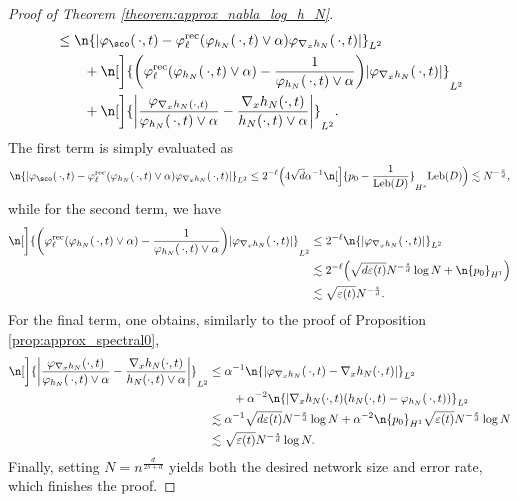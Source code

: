 \documentclass[a4paper, 11pt, headings = small, abstract]{scrartcl}
\begin{document}
\begin{proof}[Proof of Theorem \ref{theorem:approx_nabla_log_h_N}]
\begin{align*}
		&\le\n{|\varphi_\sco(\,\cdot,t)-\varphi^{\mathrm{rec}}_{\ell}(\varphi_{h_N}(\,\cdot,t)\vee\alpha)\varphi_{\nabla_xh_N}(\,\cdot,t)|}_{L^2} \\
		&\qquad+\n[\bigg]{\bigg(\varphi_{\ell}^{\mathrm{rec}}(\varphi_{h_N}(\,\cdot,t)\vee\alpha)-\frac{1}{\varphi_{h_N}(\,\cdot,t)\vee\alpha}\bigg)|\varphi_{\nabla_xh_N}(\,\cdot,t)|}_{L^2} \\
		&\qquad+\n[\bigg]{\bigg|\frac{\varphi_{\nabla_xh_N(\cdot, t)}}{\varphi_{h_N}(\,\cdot,t)\vee\alpha}-\frac{\nabla_xh_N(\cdot, t)}{h_N(\cdot, t)\vee\alpha}\bigg|}_{L^2}.
	\end{align*}
	The first term is simply evaluated as
	\[
		\n{|\varphi_\sco(\,\cdot,t)-\varphi^{\mathrm{rec}}_{\ell}(\varphi_{h_N}(\,\cdot,t)\vee\alpha)\varphi_{\nabla_xh_N}(\,\cdot,t)|}_{L^2}
		\le 2^{-\ell}\Big(4\sqrt{d}\alpha^{-1}\n[\Big]{p_0-\frac{1}{\mathrm{Leb}(D)}}_{H^s}\mathrm{Leb}(D)\Big)
		\lesssim N^{-\frac{s}{d}},
	\]
	while for the second term, we have
	\begin{align*}
		\n[\bigg]{\bigg(\varphi_{\ell}^{\mathrm{rec}}(\varphi_{h_N}(\,\cdot,t)\vee\alpha)-\frac{1}{\varphi_{h_N}(\,\cdot,t)\vee\alpha}\bigg)|\varphi_{\nabla_xh_N}(\,\cdot,t)|}_{L^2}
		&\le 2^{-\ell}\n{|\varphi_{\nabla_xh_N}(\,\cdot,t)|}_{L^2} \\
		&\lesssim2^{-\ell}\Big(\sqrt{d\varepsilon(t)}N^{-\frac{s}{d}}\log N+\n{p_0}_{H^1}\Big) \\
		&\lesssim \sqrt{\varepsilon(t)}N^{-\frac{s}{d}}.
	\end{align*}
For the final term, one obtains, similarly to the proof of Proposition \ref{prop:approx_spectral0},
	\begin{align*}
		\n[\bigg]{\bigg|\frac{\varphi_{\nabla_xh_N}(\cdot, t)}{\varphi_{h_N}(\,\cdot,t)\vee\alpha}-\frac{\nabla_xh_N(\cdot, t)}{h_N(\cdot, t)\vee\alpha}\bigg|}_{L^2}
		&\le\alpha^{-1}\n{|\varphi_{\nabla_xh_N}(\,\cdot,t)-\nabla_xh_N(\cdot, t)|}_{L^2} \\
		&\qquad+\alpha^{-2}\n{|\nabla_xh_N(\cdot, t)(h_N(\cdot, t)-\varphi_{h_N}(\,\cdot,t))}_{L^2} \\
		&\lesssim\alpha^{-1}\sqrt{d\varepsilon(t)}N^{-\frac{s}{d}}\log N
		+\alpha^{-2}\n{p_0}_{H^1}\sqrt{\varepsilon(t)}N^{-\frac{s}{d}}\log N \\
		&\lesssim \sqrt{\varepsilon(t)}N^{-\frac{s}{d}}\log N.
	\end{align*}
        Finally, setting $N=n^{\frac{d}{2s+d}}$ yields both the desired network size and error rate,	which finishes the proof.
\end{proof}
\end{document}
